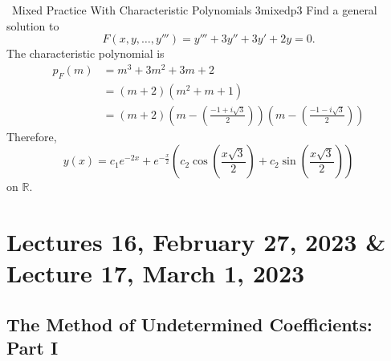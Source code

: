         \begin{example}{\Difficulty\,\Difficulty\,\,Mixed Practice With Characteristic Polynomials 3}{mixedp3}
            Find a general solution to
            \begin{equation*}
                F(x,y,\ldots,y''')=y'''+3y''+3y'+2y=0.
            \end{equation*}
            The characteristic polynomial is
            \begin{align*}
                p_F(m)&=m^3+3m^2+3m+2 \\
                &=(m+2)(m^2+m+1) \\
                &=(m+2)\left(m-\left(\frac{-1+i\sqrt{3}}{2}\right)\right)\left(m-\left(\frac{-1-i\sqrt{3}}{2}\right)\right)
            \end{align*}
            Therefore,
            \begin{equation*}
                y(x)=c_1e^{-2x}+e^{-\frac{x}{2}}\left(c_2\cos\left(\frac{x\sqrt{3}}{2}\right)+c_2\sin\left(\frac{x\sqrt{3}}{2}\right)\right)
            \end{equation*}
            on \(\mathbb{R}\).
        \end{example}

\pagebreak

\section{Lectures 16, February 27, 2023 \& Lecture 17, March 1, 2023}

    \subsection{The Method of Undetermined Coefficients: Part I}

